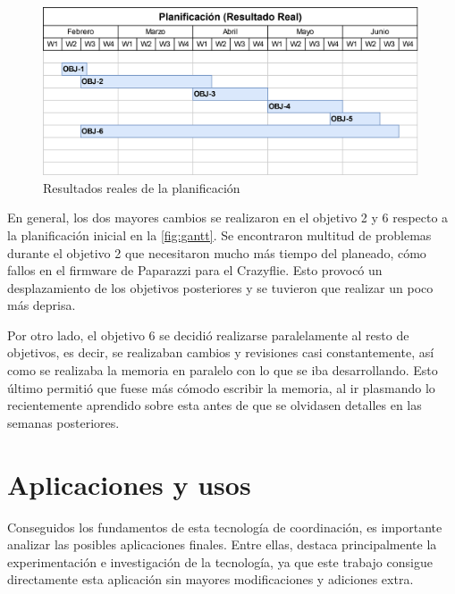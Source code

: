 \begin{figure}[h]
    \centering
    \includegraphics[width=0.99\textwidth]{img/fig/fig5.1-gantt-real.png}
    \caption{Resultados reales de la planificación}
    \label{fig:gantt-real}
\end{figure}

En general, los dos mayores cambios se realizaron en el objetivo 2 y 6 
respecto a la planificación inicial en la \autoref{fig:gantt}.
Se encontraron multitud de problemas durante el objetivo 2 que necesitaron 
mucho más tiempo del planeado, cómo fallos en el firmware de Paparazzi para el Crazyflie. 
Esto provocó un desplazamiento de los objetivos posteriores y se tuvieron que realizar un poco más deprisa.

Por otro lado, el objetivo 6 se decidió realizarse paralelamente al resto de objetivos,
es decir, se realizaban cambios y revisiones casi constantemente, así como se realizaba la memoria en paralelo con lo que se iba desarrollando. 
Esto último permitió que fuese más cómodo escribir la memoria, 
al ir plasmando lo recientemente aprendido sobre esta antes de que se olvidasen detalles en las semanas posteriores. 


\section{Aplicaciones y usos}

Conseguidos los fundamentos de esta tecnología de coordinación, es importante analizar las posibles aplicaciones finales.
Entre ellas, destaca principalmente la experimentación e investigación de la tecnología, 
ya que este trabajo consigue directamente esta aplicación sin mayores modificaciones y adiciones extra.

